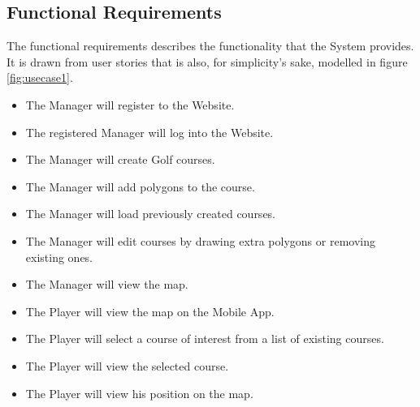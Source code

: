 \documentclass{article}
\begin{document}
    \subsection{Functional Requirements}
    The functional requirements describes the functionality that the System provides. It is drawn from user stories that is also, for simplicity's sake, modelled in figure \ref{fig:usecase1}.
    \begin{itemize}
        \item
            The Manager will register to the Website.
        \item
            The registered Manager will log into the Website.
        \item
            The Manager will create Golf courses.
        \item
            The Manager will add polygons to the course.
        \item
            The Manager will load previously created courses.
        \item
            The Manager will edit courses by drawing extra polygons or removing existing ones.
        \item
        	The Manager will view the map.
        \item
            The Player will view the map on the Mobile App.
        \item
            The Player will select a course of interest  from a list of existing courses.
        \item
            The Player will view the selected course.
        \item
        	The Player will view his position on the map.
    \end{itemize}
    
\end{document}
